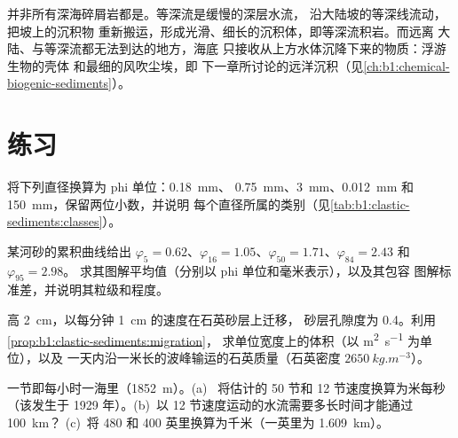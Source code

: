 并非所有深海碎屑岩都是。等深流是缓慢的深层水流，
沿大陆坡的等深线流动，把坡上的沉积物
重新搬运，形成光滑、细长的沉积体，即等深流积岩。而远离
大陆、与等深流都无法到达的地方，海底
只接收从上方水体沉降下来的物质：浮游生物的壳体
和最细的风吹尘埃，即
下一章所讨论的远洋沉积（见\cref{ch:b1:chemical-biogenic-sediments}）。

\section{练习}

\begin{exercise}[$\star$]\label{exo:b1:clastic-sediments:1}
将下列直径换算为 phi 单位：\qty{0.18}{mm}、
\qty{0.75}{mm}、\qty{3}{mm}、\qty{0.012}{mm} 和 \qty{150}{mm}，保留两位小数，并说明
每个直径所属的类别（见\cref{tab:b1:clastic-sediments:classes}）。
\end{exercise}

\begin{exercise}[$\star$]\label{exo:b1:clastic-sediments:2}
某河砂的累积曲线给出 $\varphi_5 = 0.62$、$\varphi_{16} =
1.05$、$\varphi_{50} = 1.71$、$\varphi_{84} = 2.43$ 和 $\varphi_{95} = 2.98$。
求其图解平均值（分别以 phi 单位和毫米表示），以及其包容
图解标准差，并说明其粒级和程度。
\end{exercise}

\begin{exercise}[$\star$]\label{exo:b1:clastic-sediments:3}
高 \qty{2}{cm}，以每分钟 \qty{1}{cm} 的速度在石英砂层上迁移，
砂层孔隙度为 \num{0.4}。利用\cref{prop:b1:clastic-sediments:migration}，
求单位宽度上的体积（以 \si{m^2.s^{-1}} 为单位），以及
一天内沿一米长的波峰输运的石英质量（石英密度 $\qty{2650}{kg.m^{-3}}$）。
\end{exercise}

\begin{exercise}[$\star$]\label{exo:b1:clastic-sediments:4}
一节即每小时一海里（\qty{1852}{m}）。(a)~
将估计的 50 节和 12 节速度换算为米每秒（该发生于
1929 年）。(b)~以 12 节速度运动的水流需要多长时间才能通过 \qty{100}{km}？
(c)~将 480 和 400 英里换算为千米（一英里为 \qty{1.609}{km}）。
\end{exercise}

